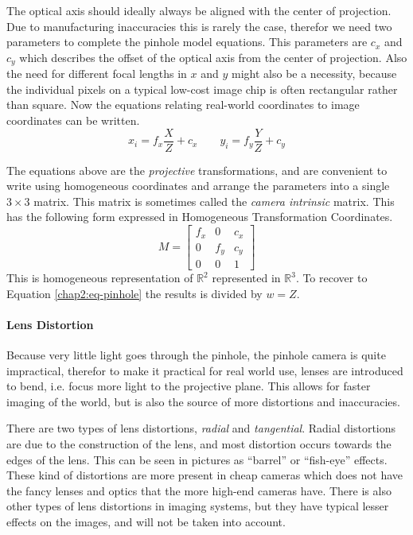 The optical axis should ideally always be aligned with the center of projection. Due to
manufacturing inaccuracies this is rarely the case, therefor we need two parameters
to complete the pinhole model equations. This parameters are $c_x$ and $c_y$ which
describes the offset of the optical axis from the center of projection. Also the need for
different focal lengths in $x$ and $y$ might also be a necessity, because the individual
pixels on a typical low-cost image chip is often rectangular rather than square. Now the
equations relating real-world coordinates to image coordinates can be written.
\cite{openCV}
\begin{equation}
    \label{chap2:eq-pinhole}
    x_i = f_x \frac{X}{Z} + c_x \quad \quad y_i = f_y \frac{Y}{Z} + c_y
\end{equation}

The equations above are the \emph{projective} transformations, and are convenient to
write using homogeneous coordinates and arrange the parameters into a single $3\times 3$
matrix. This matrix is sometimes called the \emph{camera intrinsic} matrix. This has the
following form expressed in Homogeneous Transformation Coordinates. 
\begin{equation}
    M = \left[ \begin{matrix}
                f_x & 0 & c_x \\
                0 & f_y & c_y \\
                0 & 0 & 1 
                \end{matrix} \right]
\end{equation}
This is homogeneous representation of $\mathbb{R}^2$ represented in $\mathbb{R}^3$. To
recover to Equation \eqref{chap2:eq-pinhole} the results is divided by $w = Z$.

\paragraph{Lens Distortion}
\label{chap2:sec-distortion}
Because very little light goes through the pinhole, the pinhole camera is quite
impractical, therefor to make it practical for
real world use, lenses are introduced to bend, i.e. focus more light to the projective plane.
This allows for faster imaging of the world, but is also the source of more distortions
and inaccuracies. 

There are two types of lens distortions, \emph{radial} and \emph{tangential}. Radial
distortions are due to the construction of the lens, and most distortion occurs towards the edges of
the lens. This can be seen in pictures as ``barrel'' or ``fish-eye'' effects. 
These kind of distortions are more present in cheap cameras which does not have the fancy lenses and optics
that the more high-end cameras have. There is also other types of lens distortions in imaging
systems, but they have typical lesser effects on the images, and will not be taken into
account. 


